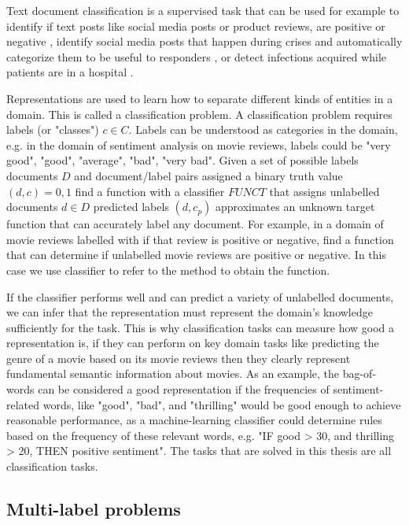 Text document classification is a supervised task that can be used for example to identify if text posts like social media posts or product reviews, are positive or negative \cite{Burel2018},  identify social media posts that happen during crises and automatically categorize them to be useful to responders \cite{Burel2018},  or detect infections acquired while patients are in a hospital . 

Representations are  used to learn how to separate different kinds of entities in a domain. This is called a classification problem. A classification problem requires  labels (or "classes") $c \in C$. Labels can be understood as categories in the domain, e.g. in the domain of sentiment analysis on movie reviews, labels could be "very good", "good", "average", "bad", "very bad". Given a set of possible labels documents $D$ and document/label pairs assigned a binary truth value $(d, c) = {0, 1}$ find a function with a classifier $FUNCT$ that assigns unlabelled documents $d \in D$ predicted labels $(d, c_p) $ approximates an unknown target function that can accurately label any document. For example, in a domain of movie reviews labelled with if that review is positive or negative, find a function that can determine if unlabelled movie reviews are positive or negative. In this case we use classifier to refer to the method to obtain the function.

If the classifier performs well and can predict a variety of unlabelled documents, we can infer that  the representation must represent the domain's knowledge sufficiently for the task. This is why classification tasks can measure how good a representation is, if they can perform on key domain tasks like predicting the genre of a movie based on its movie reviews then they clearly represent fundamental semantic information about movies.  As an example,  the bag-of-words can be considered a good representation if the frequencies of sentiment-related words, like "good", "bad", and "thrilling" would be good enough to achieve reasonable performance, as a machine-learning classifier could determine rules based on the frequency of these relevant words, e.g. "IF good > 30, and thrilling > 20, THEN positive sentiment". The tasks that are solved in this thesis are all classification tasks. 


\subsection{Multi-label problems}\label{bg:multi-label}

